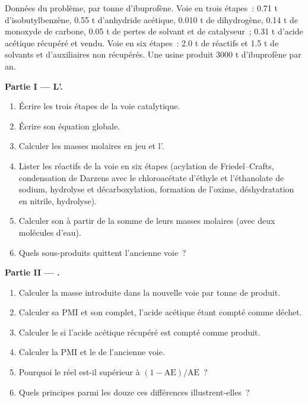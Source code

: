 \begin{problem}
\label{pb:b3:green-industrial:1}
Données du problème, par tonne d'ibuprofène. Voie en trois étapes~: 0.71 t
d'isobutylbenzène, 0.55 t d'anhydride acétique, 0.010 t de dihydrogène,
0.14 t de monoxyde de carbone, 0.05 t de pertes de solvant et de
catalyseur~; 0.31 t d'acide acétique récupéré et vendu. Voie en six
étapes~: 2.0 t de réactifs et 1.5 t de solvants et d'auxiliaires non
récupérés. Une usine produit 3000 t d'ibuprofène par an.

\medskip\noindent\textbf{Partie I --- L'.}
\begin{enumerate}
  \item Écrire les trois étapes de la voie catalytique.
  \item Écrire son équation globale.
  \item Calculer les masses molaires en jeu et l'.
  \item Lister les réactifs de la voie en six étapes (acylation de
        Friedel--Crafts, condensation de Darzens avec le chloroacétate
        d'éthyle et l'éthanolate de sodium, hydrolyse et décarboxylation,
        formation de l'oxime, déshydratation en nitrile, hydrolyse).
  \item Calculer son  à partir de la somme de leurs
        masses molaires (avec deux molécules d'eau).
  \item Quels sous-produits quittent l'ancienne voie~?
\end{enumerate}

\medskip\noindent\textbf{Partie II --- .}
\begin{enumerate}[resume]
  \item Calculer la masse introduite dans la nouvelle voie par tonne de
        produit.
  \item Calculer sa PMI et son  complet, l'acide acétique étant
        compté comme déchet.
  \item Calculer le  si l'acide acétique récupéré est compté comme
        produit.
  \item Calculer la PMI et le  de l'ancienne voie.
  \item Pourquoi le  réel est-il supérieur à $(1 - \mathrm{AE})/\mathrm{AE}$~?
  \item Quels principes parmi les douze ces différences illustrent-elles~?
\end{enumerate}


\end{problem}
